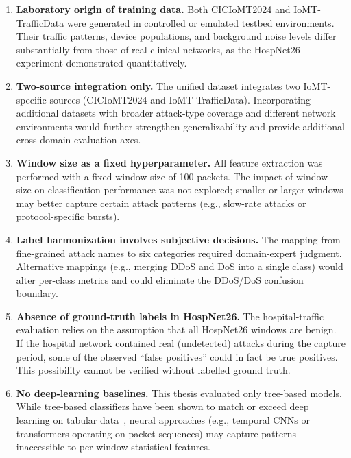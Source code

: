 \begin{enumerate}[nosep]
  \item \textbf{Laboratory origin of training data.}
  Both CICIoMT2024 and IoMT-TrafficData were generated in controlled or emulated testbed environments. Their traffic patterns, device populations, and background noise levels differ substantially from those of real clinical networks, as the HospNet26 experiment demonstrated quantitatively.

  \item \textbf{Two-source integration only.}
  The unified dataset integrates two IoMT-specific sources (CICIoMT2024 and IoMT-TrafficData). Incorporating additional datasets with broader attack-type coverage and different network environments would further strengthen generalizability and provide additional cross-domain evaluation axes.

  \item \textbf{Window size as a fixed hyperparameter.}
  All feature extraction was performed with a fixed window size of 100 packets. The impact of window size on classification performance was not explored; smaller or larger windows may better capture certain attack patterns (e.g., slow-rate attacks or protocol-specific bursts).

  \item \textbf{Label harmonization involves subjective decisions.}
  The mapping from fine-grained attack names to six categories required domain-expert judgment. Alternative mappings (e.g., merging DDoS and DoS into a single class) would alter per-class metrics and could eliminate the DDoS/DoS confusion boundary.

  \item \textbf{Absence of ground-truth labels in HospNet26.}
  The hospital-traffic evaluation relies on the assumption that all HospNet26 windows are benign. If the hospital network contained real (undetected) attacks during the capture period, some of the observed ``false positives'' could in fact be true positives. This possibility cannot be verified without labelled ground truth.

  \item \textbf{No deep-learning baselines.}
  This thesis evaluated only tree-based models. While tree-based classifiers have been shown to match or exceed deep learning on tabular data~\cite{grinsztajn2022tree}, neural approaches (e.g., temporal CNNs or transformers operating on packet sequences) may capture patterns inaccessible to per-window statistical features.
\end{enumerate}


